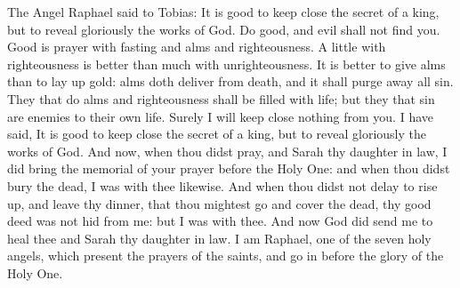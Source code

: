  The Angel Raphael said to Tobias: It is good to keep close the secret of a king, but to reveal gloriously the works of God. Do good, and evil shall not find you. Good is prayer with fasting and alms and righteousness. A little with righteousness is better than much with unrighteousness. It is better to give alms than to lay up gold: alms doth deliver from death, and it shall purge away all sin. They that do alms and righteousness shall be filled with life; but they that sin are enemies to their own life. Surely I will keep close nothing from you. I have said, It is good to keep close the secret of a king, but to reveal gloriously the works of God. And now, when thou didst pray, and Sarah thy daughter in law, I did bring the memorial of your prayer before the Holy One: and when thou didst bury the dead, I was with thee likewise.  And when thou didst not delay to rise up, and leave thy dinner, that thou mightest go and cover the dead, thy good deed was not hid from me: but I was with thee. And now God did send me to heal thee and Sarah thy daughter in law. I am Raphael, one of the seven holy angels, which present the prayers of the saints, and go in before the glory of the Holy One. 


